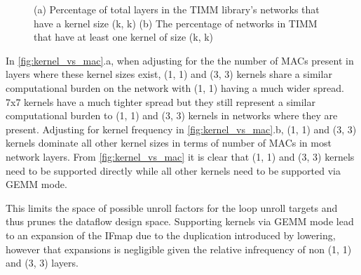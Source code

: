 \begin{figure}
    \centering
    \caption{(a) Percentage of total layers in the TIMM library's networks that have a kernel size (k, k) (b) The percentage of networks in TIMM that have at least one kernel of size (k, k)}
    \label{fig:kernel_stats:freq}
\end{figure}


In \autoref{fig:kernel_vs_mac}.a, when adjusting for the the number of MACs
present in layers where these kernel sizes exist, (1, 1) and (3, 3) kernels share a
similar computational burden on the network with (1, 1) having a much wider spread.
7x7 kernels have a much tighter spread but they still represent a similar
computational burden to (1, 1) and (3, 3) kernels in networks where they are present.
Adjusting for kernel frequency in \autoref{fig:kernel_vs_mac}.b, (1, 1) and (3, 3)
kernels dominate all other kernel sizes in terms of number of MACs in most
network layers. From \autoref{fig:kernel_vs_mac} it is clear that (1, 1) and (3, 3)
kernels need to be supported directly while all other kernels need to be
supported via GEMM mode. 

This limits the space of possible unroll
factors for the loop unroll targets and thus prunes the dataflow design space.
Supporting kernels via GEMM mode lead to an expansion of the IFmap due to the
duplication introduced by lowering, however that expansions is negligible given
the relative infrequency of non (1, 1) and (3, 3) layers. 

